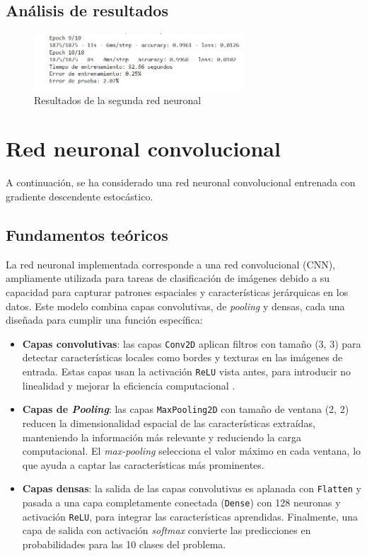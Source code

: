 \subsection{Análisis de resultados}

\begin{figure}[H]
	\centering
	\includegraphics[width=0.7\textwidth]{imgs/results-red2.JPG}
	\caption{Resultados de la segunda red neuronal}
	\label{fig:results-red2}
\end{figure}


\section{Red neuronal convolucional}

A continuación, se ha considerado una red neuronal convolucional entrenada con gradiente descendente estocástico.

\subsection{Fundamentos teóricos}

La red neuronal implementada corresponde a una red convolucional (CNN), ampliamente utilizada para tareas de clasificación de imágenes debido a su capacidad para capturar patrones espaciales y características jerárquicas en los datos. Este modelo combina capas convolutivas, de \textit{pooling} y densas, cada una diseñada para cumplir una función específica:

\begin{itemize}
	\item \textbf{Capas convolutivas}: las capas \texttt{Conv2D} aplican filtros con tamaño (3, 3) para detectar características locales como bordes y texturas en las imágenes de entrada. Estas capas usan la activación \texttt{ReLU} vista antes, para introducir no linealidad y mejorar la eficiencia computacional \parencite{nair2010relu}.
	\item \textbf{Capas de \textit{Pooling}}: las capas \texttt{MaxPooling2D} con tamaño de ventana (2, 2) reducen la dimensionalidad espacial de las características extraídas, manteniendo la información más relevante y reduciendo la carga computacional. El \textit{max-pooling} selecciona el valor máximo en cada ventana, lo que ayuda a captar las características más prominentes.
	\item \textbf{Capas densas}: la salida de las capas convolutivas es aplanada con \texttt{Flatten} y pasada a una capa completamente conectada (\texttt{Dense}) con 128 neuronas y activación \texttt{ReLU}, para integrar las características aprendidas. Finalmente, una capa de salida con activación \textit{softmax} convierte las predicciones en probabilidades para las 10 clases del problema.
\end{itemize}


